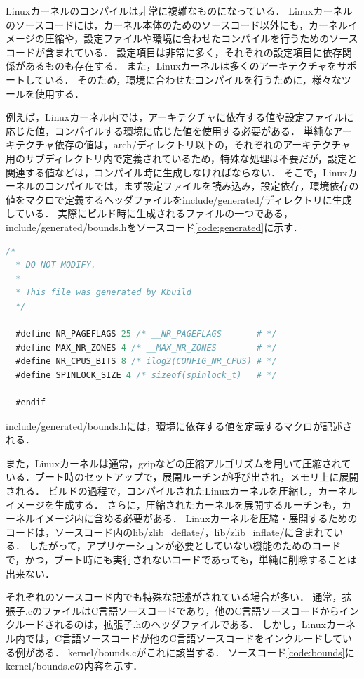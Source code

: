 \documentclass[graduation-thesis]{mlarticle}
\begin{document}
Linuxカーネルのコンパイルは非常に複雑なものになっている．
Linuxカーネルのソースコードには，カーネル本体のためのソースコード以外にも，カーネルイメージの圧縮や，設定ファイルや環境に合わせたコンパイルを行うためのソースコードが含まれている．
設定項目は非常に多く，それぞれの設定項目に依存関係があるものも存在する．
また，Linuxカーネルは多くのアーキテクチャをサポートしている．
そのため，環境に合わせたコンパイルを行うために，様々なツールを使用する．

例えば，Linuxカーネル内では，アーキテクチャに依存する値や設定ファイルに応じた値，コンパイルする環境に応じた値を使用する必要がある．
単純なアーキテクチャ依存の値は，arch/ディレクトリ以下の，それぞれのアーキテクチャ用のサブディレクトリ内で定義されているため，特殊な処理は不要だが，設定と関連する値などは，コンパイル時に生成しなければならない．
そこで，Linuxカーネルのコンパイルでは，まず設定ファイルを読み込み，設定依存，環境依存の値をマクロで定義するヘッダファイルをinclude/generated/ディレクトリに生成している．
実際にビルド時に生成されるファイルの一つである，include/generated/bounds.hをソースコード\ref{code:generated}に示す．

\begin{lstlisting}[language=C, caption=include/generated/bounds.h, label=code:generated]
  /*
  * DO NOT MODIFY.
  *
  * This file was generated by Kbuild
  */

  #define NR_PAGEFLAGS 25 /* __NR_PAGEFLAGS       # */
  #define MAX_NR_ZONES 4 /* __MAX_NR_ZONES        # */
  #define NR_CPUS_BITS 8 /* ilog2(CONFIG_NR_CPUS) # */
  #define SPINLOCK_SIZE 4 /* sizeof(spinlock_t)   # */

  #endif
\end{lstlisting}

include/generated/bounds.hには，環境に依存する値を定義するマクロが記述される．

また，Linuxカーネルは通常，gzipなどの圧縮アルゴリズムを用いて圧縮されている．ブート時のセットアップで，展開ルーチンが呼び出され，メモリ上に展開される．
ビルドの過程で，コンパイルされたLinuxカーネルを圧縮し，カーネルイメージを生成する．
さらに，圧縮されたカーネルを展開するルーチンも，カーネルイメージ内に含める必要がある．
Linuxカーネルを圧縮・展開するためのコードは，ソースコード内のlib/zlib\_deflate/，lib/zlib\_inflate/に含まれている．
したがって，アプリケーションが必要としていない機能のためのコードで，かつ，ブート時にも実行されないコードであっても，単純に削除することは出来ない．

それぞれのソースコード内でも特殊な記述がされている場合が多い．
通常，拡張子.cのファイルはC言語ソースコードであり，他のC言語ソースコードからインクルードされるのは，拡張子.hのヘッダファイルである．
しかし，Linuxカーネル内では，C言語ソースコードが他のC言語ソースコードをインクルードしている例がある．
kernel/bounds.cがこれに該当する．
ソースコード\ref{code:bounds}にkernel/bounds.cの内容を示す．
\end{document}
